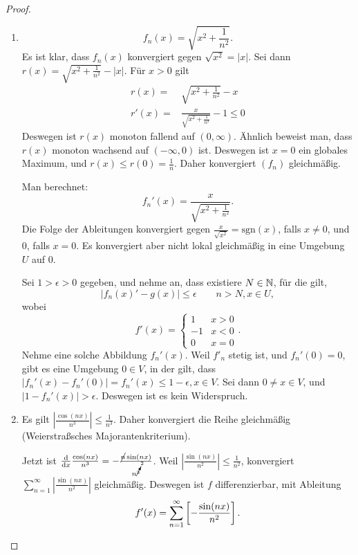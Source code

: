 \begin{proof}
	\begin{enumerate}[label=\roman*)]
		\item \[
		f_n(x)=\sqrt{x^2+\frac{1}{n^2}} 
		.\] 
		Es ist klar, dass $f_n(x)$ konvergiert gegen $\sqrt{x^2} =|x|$. Sei dann $r(x)=\sqrt{x^2+\frac{1}{n^2}} -|x|$. F\"{u}r $x>0$ gilt
		\begin{align*}
			r(x)=& \sqrt{x^2+\frac{1}{n^2}}-x\\
			r'(x)=& \frac{x}{\sqrt{x^2+\frac{1}{n^2}} }-1\le 0
		\end{align*}
		Deswegen ist $r(x)$ monoton fallend auf $(0,\infty)$. Ähnlich beweist man, dass $r(x)$ monoton wachsend auf $(-\infty, 0)$ ist. Deswegen ist $x=0$ ein globales Maximum, und $r(x)\le r(0)=\frac{1}{n}$. Daher konvergiert $(f_n)$ gleichmäßig.

		Man berechnet:
		\[
			f_n'(x)=\frac{x}{\sqrt{x^2+\frac{1}{n^2}} }
		.\] 
		Die Folge der Ableitungen konvergiert gegen $\frac{x}{\sqrt{x^2} }=\text{sgn}(x)$, falls $x\neq 0$, und $0$, falls $x=0$. Es konvergiert aber nicht lokal gleichmäßig in eine Umgebung $U$ auf $0$.

		Sei $1>\epsilon>0$ gegeben, und nehme an, dass existiere $N\in \mathbb{N}$, f\"{u}r die gilt, 
		\[
		|f_n(x)'-g(x)|\le \epsilon\qquad n>N,x\in U
		,\] 
		wobei
		\[
		f'(x)=\begin{cases}
			1 & x > 0\\
			-1 & x < 0\\
			0 & x = 0
		\end{cases}
		.\] 
Nehme eine solche Abbildung $f_n'(x)$. Weil $f'_n$ stetig ist, und $f_n'(0)=0$, gibt es eine Umgebung $0\in V$, in der gilt, dass $|f_n'(x)-f_n'(0)|=f_n'(x)\le 1-\epsilon, x\in V$. Sei dann  $0\neq x\in V$, und $|1-f_n'(x)|>\epsilon$. Deswegen ist es kein Widerspruch.

\item Es gilt $\left|\frac{\cos(nx)}{n^3}\right|\le \frac{1}{n^3}$. Daher konvergiert die Reihe gleichmäßig (Weierstraßsches Majorantenkriterium).

	Jetzt ist $\dv{x} \frac{\cos(nx)}{n^3}=-\frac{\cancel{n}\sin(nx)}{n^{\cancelto{2}{3}}}$. Weil $\left|\frac{\sin(nx)}{n^2}\right|\le \frac{1}{n^2}$, konvergiert $\sum_{n=1}^{\infty} \left| \frac{\sin(nx)}{n^2} \right|$ gleichmäßig. Deswegen ist $f$ differenzierbar, mit Ableitung
	\[
		f'(x)=\sum_{n=1}^{\infty} \left[ -\frac{\sin(nx)}{n^2} \right] 
	.\qedhere\] 
\end{enumerate}
\end{proof}
